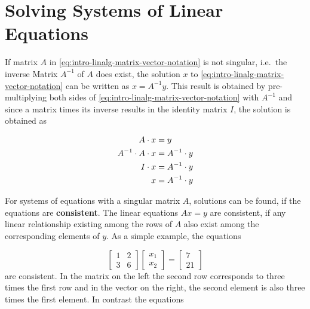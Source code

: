 \documentclass[]{book}
\theoremstyle{definition}
\theoremstyle{definition}
\theoremstyle{definition}
\theoremstyle{remark}
\begin{document}
\hypertarget{intro-linalg-solving-systems-of-linear-equations}{%
\section{Solving Systems of Linear Equations}\label{intro-linalg-solving-systems-of-linear-equations}}

If matrix \(A\) in \eqref{eq:intro-linalg-matrix-vector-notation} is not singular, i.e.~the inverse Matrix \(A^{-1}\) of \(A\) does exist, the solution \(x\) to \eqref{eq:intro-linalg-matrix-vector-notation} can be written as \(x = A^{-1}y\). This result is obtained by pre-multiplying both sides of \eqref{eq:intro-linalg-matrix-vector-notation} with \(A^{-1}\) and since a matrix times its inverse results in the identity matrix \(I\), the solution is obtained as

\begin{align}
            A \cdot x  &=  y \notag \\
A^{-1}\cdot A \cdot x  &=  A^{-1} \cdot y \notag \\
            I \cdot x  &=  A^{-1} \cdot y \notag \\
                    x  &=  A^{-1} \cdot y
\label{eq:intro-linalg-matrix-vector-notation-solution-derivation}
\end{align}

For systems of equations with a singular matrix \(A\), solutions can be found, if the equations are \textbf{consistent}. The linear equations \(Ax = y\) are consistent, if any linear relationship existing among the rows of \(A\) also exist among the corresponding elements of \(y\). As a simple example, the equations

\[
\left[
\begin{array}{cc}
1  &  2  \\
3  &  6
\end{array}\right]
\left[
\begin{array}{c}
x_1  \\
x_2
\end{array}\right]
=
\left[
\begin{array}{c}
7  \\
21
\end{array}\right]
\]
are consistent. In the matrix on the left the second row corresponds to three times the first row and in the vector on the right, the second element is also three times the first element. In contrast the equations
\end{document}
